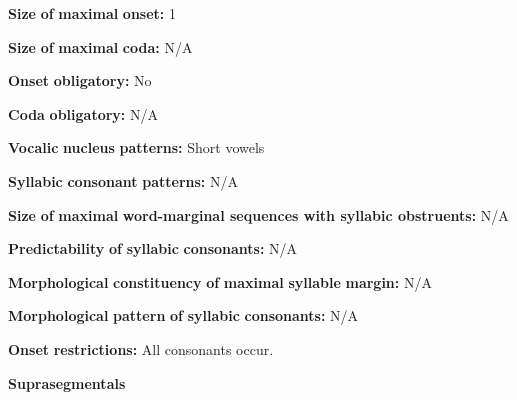 \documentclass[output=paper]{langsci/langscibook}
\begin{document}
\begin{styleBody}
\textbf{Size} \textbf{of} \textbf{maximal} \textbf{onset:} 1
\end{styleBody}

\begin{styleBody}
\textbf{Size} \textbf{of} \textbf{maximal} \textbf{coda:} N/A
\end{styleBody}

\begin{styleBody}
\textbf{Onset} \textbf{obligatory:} No
\end{styleBody}

\begin{styleBody}
\textbf{Coda} \textbf{obligatory:} N/A
\end{styleBody}

\begin{styleBody}
\textbf{Vocalic} \textbf{nucleus} \textbf{patterns:} Short vowels
\end{styleBody}

\begin{styleBody}
\textbf{Syllabic} \textbf{consonant} \textbf{patterns:} N/A
\end{styleBody}

\begin{styleBody}
\textbf{Size} \textbf{of} \textbf{maximal} \textbf{word{}-marginal sequences with syllabic obstruents:} N/A
\end{styleBody}

\begin{styleBody}
\textbf{Predictability} \textbf{of} \textbf{syllabic} \textbf{consonants:} N/A
\end{styleBody}

\begin{styleBody}
\textbf{Morphological} \textbf{constituency} \textbf{of} \textbf{maximal} \textbf{syllable} \textbf{margin:} N/A
\end{styleBody}

\begin{styleBody}
\textbf{Morphological} \textbf{pattern} \textbf{of} \textbf{syllabic} \textbf{consonants:} N/A
\end{styleBody}

\begin{styleBody}
\textbf{Onset} \textbf{restrictions:} All consonants occur.
\end{styleBody}

\begin{styleBody}
\textbf{Suprasegmentals}
\end{styleBody}
\end{document}
